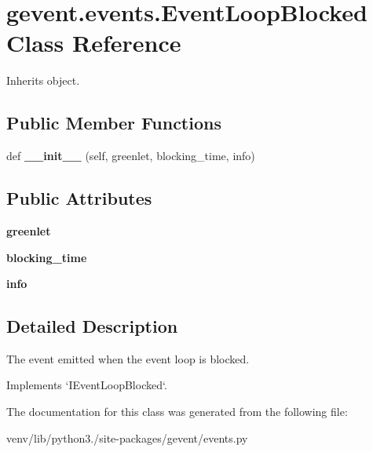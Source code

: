 \hypertarget{classgevent_1_1events_1_1_event_loop_blocked}{}\section{gevent.\+events.\+Event\+Loop\+Blocked Class Reference}
\label{classgevent_1_1events_1_1_event_loop_blocked}


Inherits object.

\subsection*{Public Member Functions}
\begin{DoxyCompactItemize}
\item 
\mbox{\label{classgevent_1_1events_1_1_event_loop_blocked_ac3dece7183298e50bb2c08c19f6415bb}} 
def {\bfseries \+\_\+\+\_\+init\+\_\+\+\_\+} (self, greenlet, blocking\+\_\+time, info)
\end{DoxyCompactItemize}
\subsection*{Public Attributes}
\begin{DoxyCompactItemize}
\item 
\mbox{\label{classgevent_1_1events_1_1_event_loop_blocked_a913cc7e7a4d68970acb6e213d4f67bcb}} 
{\bfseries greenlet}
\item 
\mbox{\label{classgevent_1_1events_1_1_event_loop_blocked_ae33af0d4b969a8dbc593388489c8bdda}} 
{\bfseries blocking\+\_\+time}
\item 
\mbox{\label{classgevent_1_1events_1_1_event_loop_blocked_a915c10ee4eff99ceb01b6834cdce6f4e}} 
{\bfseries info}
\end{DoxyCompactItemize}


\subsection{Detailed Description}
\begin{DoxyVerb}The event emitted when the event loop is blocked.

Implements `IEventLoopBlocked`.
\end{DoxyVerb}
 

The documentation for this class was generated from the following file\+:\begin{DoxyCompactItemize}
\item 
venv/lib/python3./site-\/packages/gevent/events.\+py\end{DoxyCompactItemize}
